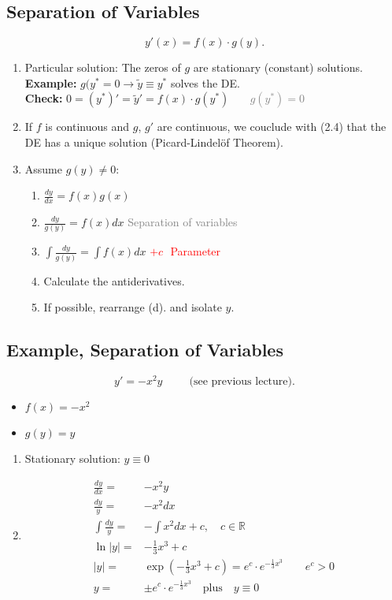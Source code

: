 \documentclass[]{article}
\begin{document}
	\subsection{Separation of Variables}
	\[
	y'(x) = f(x) \cdot g(y)
	.\]
	\begin{enumerate}
		\item Particular solution: The zeros of $g$ are stationary (constant) solutions.\\ \textbf{Example:} $g(y ^{*} = 0 \rightarrow \tilde y \equiv y ^{*}$ solves the DE. \\ \textbf{Check:} $0=(y ^{*})' = \tilde y' = f(x) \cdot g(y ^{*})$ \textcolor{gray}{$~~~~~~~g(y ^{*})=0$}
		\item If $f$ is continuous and $g$, $g'$ are continuous, we couclude with (2.4) that the DE has a unique solution (Picard-Lindelöf Theorem).
		\item Assume $g(y)\not=0$:
			\begin{enumerate}
				\item $\frac{dy}{dx}=f(x)g(x)$
				\item $ \frac{dy}{g(y)}= f(x) dx$ \textcolor{gray}{Separation of variables}
				\item $\int \frac{dy}{g(y)}= \int f(x) dx $ \textcolor{red}{$+c~~~$Parameter}
				\item Calculate the antiderivatives.
				\item If possible, rearrange (d). and isolate $y$.
			\end{enumerate}	
	\end{enumerate}	
	\subsection{Example, Separation of Variables}
	\[
	y'=-x ^{2}y~~~~~~~~~~~ \text{(see previous lecture)}
	.\]
	\begin{itemize}
		\item $f(x)=-x ^{2}$
		\item $g(y)=y$
	\end{itemize}
	\begin{enumerate}
		\item Stationary solution: $y\equiv 0$
		\item  
			\[
			\begin{split}
			\frac{dy}{dx} = & - x ^{2}y \\
			\frac{dy}{y} = & - x ^{2} dx \\
			\int \frac{dy}{y} = & - \int x ^{2} dx + c, \quad c \in \mathbb{R} \\
			\ln |y| = & -\frac{1}{3}x ^{3} + c \\
			|y| = & \exp\left( -\frac{1}{3} x ^{3} + c \right) = e ^{c} \cdot e ^{ - \frac{1}{3}x ^{3}}\quad \quad e ^{c} > 0 \\
			y = & \pm e ^{c} \cdot e ^{- \frac{1}{3}x ^{3}}\quad \text{plus}\quad y\equiv 0
			\end{split}
			\]
	\end{enumerate}
\end{document}
